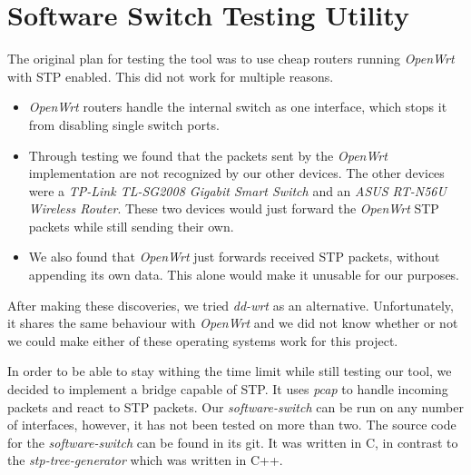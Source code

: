 \chapter{Software Switch Testing Utility}
\label{switch}
The original plan for testing the tool was to use cheap routers running \textit{OpenWrt}\cite{OpenWrt} with STP enabled.
This did not work for multiple reasons.
\begin{itemize}
    \item \textit{OpenWrt} routers handle the internal switch as one interface, which stops it from disabling single switch ports.
    \item Through testing we found that the packets sent by the \textit{OpenWrt} implementation are not recognized by our other devices.
    The other devices were a \textit{TP-Link TL-SG2008 Gigabit Smart Switch} and an \textit{ASUS RT-N56U Wireless Router}.
    These two devices would just forward the \textit{OpenWrt} STP packets while still sending their own.
    \item We also found that \textit{OpenWrt} just forwards received STP packets, without appending its own data.
    This alone would make it unusable for our purposes.
\end{itemize}

After making these discoveries, we tried \textit{dd-wrt}\cite{dd-wrt} as an alternative.
Unfortunately, it shares the same behaviour with \textit{OpenWrt} and we did not know whether or not we could make either of these operating systems work for this project.

In order to be able to stay withing the time limit while still testing our tool, we decided to implement a bridge capable of STP.
It uses \textit{pcap} to handle incoming packets and react to STP packets.
Our \textit{software-switch} can be run on any number of interfaces, however, it has not been tested on more than two.
The source code for the \textit{software-switch} can be found in its git\cite{software-switch}.
It was written in C, in contrast to the \textit{stp-tree-generator} which was written in C++.

